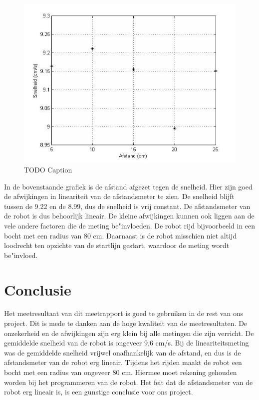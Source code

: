 \documentclass{report}
\begin{document}
\begin{figure}[H]
 \centering
\includegraphics[width=150mm] {afstand-snelheid.jpg}
\caption{TODO Caption}
\end{figure}
In de bovenstaande grafiek is de afstand afgezet tegen de snelheid. Hier zijn goed de afwijkingen in lineariteit van de afstandsmeter te zien. De snelheid blijft tussen de 9.22 en de 8.99, dus de snelheid is vrij constant. De afstandsmeter van de robot is dus behoorlijk lineair. De kleine afwijkingen kunnen ook liggen aan de vele andere factoren die de meting be"invloeden. De robot rijd bijvoorbeeld in een bocht met een radius van 80 cm. Daarnaast is de robot misschien niet altijd loodrecht ten opzichte van de startlijn gestart, waardoor de meting wordt be"invloed.
\newpage
\chapter{Conclusie}
Het meetresultaat van dit meetrapport is goed te gebruiken in de rest van ons project. Dit is mede te danken aan de hoge kwaliteit van de meetresultaten. De onzekerheid en de afwijkingen zijn erg klein bij alle metingen die zijn verricht. De gemiddelde snelheid van de robot is ongeveer 9,6 cm/s. Bij de lineariteitsmeting was de gemiddelde snelheid vrijwel onafhankelijk van de afstand, en dus is de afstandsmeter van de robot erg lineair. Tijdens het rijden maakt de robot een bocht met een radius van ongeveer 80 cm. Hiermee moet rekening gehouden worden bij het programmeren van de robot. Het feit dat de afstandsmeter van de robot erg lineair is, is een gunstige conclusie voor ons project.
\end{document}
